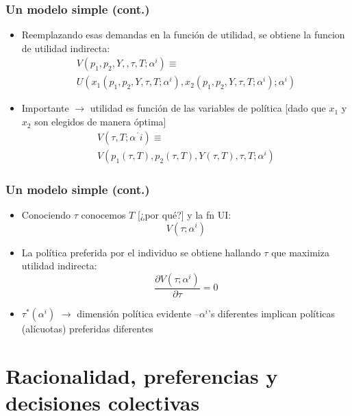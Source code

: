 \documentclass[14pt,aspectratio=169]{beamer}
\begin{document}
    \begin{frame}\frametitle{Un modelo simple (cont.)}
    \begin{itemize}\itemsep 10pt
    \item Reemplazando esas demandas en la función de utilidad, se
      obtiene la funcion de utilidad indirecta:
      \begin{align*}
        V(p_{1},p_{2},Y,,\tau,T;\alpha^{i}) \equiv \\
        U(x_{1}(p_{1},p_{2},Y,\tau,T;\alpha^{i}),x_{2}(p_{1},p_{2},Y,\tau,T;\alpha^{i});\alpha^{i})
      \end{align*}
      \item Importante $\longrightarrow$ utilidad es función de las
        variables de política [dado que $x_{1}$ y $x_{2}$ son elegidos
        de manera óptima]
        \begin{align*}
V(\tau,T;\alpha^´{i}) \equiv \\ V(p_{1}(\tau,T),p_{2}(\tau,T),Y(\tau,T),\tau,T;\alpha^{i})
          \end{align*}
      \end{itemize}
    \end{frame}
    

   \begin{frame}\frametitle{Un modelo simple (cont.)}
    \begin{itemize}\itemsep 10pt
    \item Conociendo $\tau$ conocemos $T$ [¿por qué?] y la fn UI:
      \begin{equation*}
V(\tau;\alpha^{i})
\end{equation*}
\item La política preferida por el individuo se obtiene hallando $\tau$
  que maximiza utilidad indirecta:
  \begin{equation*}
\frac{\partial V(\tau;\alpha^{i})}{\partial \tau}=0
\end{equation*}
\item  $\tau^{*}(\alpha^{i})$ $\longrightarrow$
  dimensión política evidente --$\alpha^{i}$'s diferentes implican
  políticas (alícuotas) preferidas diferentes
      \end{itemize}
    \end{frame}
    


    
\section{Racionalidad, preferencias y decisiones colectivas}
\end{document}
